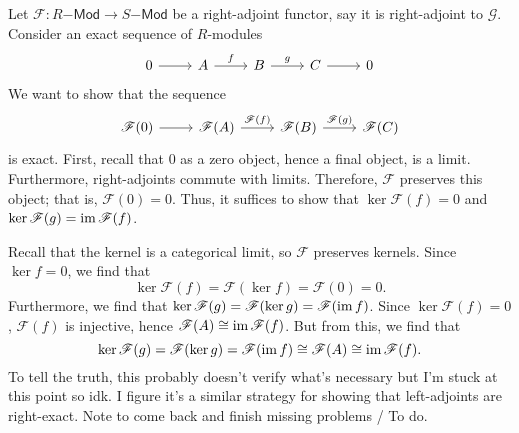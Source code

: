 \documentclass[../../master.tex]{subfiles}
\begin{document}
\begin{solution}
    Let $\mathscr{F} : R\mathsf{-Mod} \to S\mathsf{-Mod}$ be a right-adjoint functor, say it is right-adjoint to $\mathscr{G}$.
    Consider an exact sequence of $R$-modules
    \[
    \begin{tikzcd}
        0 & A & B & C & 0
        \arrow[from=1-1, to=1-2]
        \arrow["f", from=1-2, to=1-3]
        \arrow["g", from=1-3, to=1-4]
        \arrow[from=1-4, to=1-5] 
    \end{tikzcd}
    \]
    We want to show that the sequence
    \[
        \begin{tikzcd}
            \mathscr{F}(0) & \mathscr{F}(A) & \mathscr{F}(B) & \mathscr{F}(C)
            \arrow[from=1-1, to=1-2] 
            \arrow["\mathscr{F}(f)", from=1-2, to=1-3]
            \arrow["\mathscr{F}(g)", from=1-3, to=1-4]
        \end{tikzcd}
    \]
    is exact.
    First, recall that $0$ as a zero object, hence a final object, is a limit.
    Furthermore, right-adjoints commute with limits.
    Therefore, $\mathscr{F}$ preserves this object; that is, $\mathscr{F}(0) = 0$.
    Thus, it suffices to show that $\ker\mathscr{F}(f) = 0$ and $\ker \mathscr{F}(g) = \operatorname{im} \mathscr{F}(f)$.

    Recall that the kernel is a categorical limit, so $\mathscr{F}$ preserves kernels.
    Since $\ker f = 0$, we find that
    \[
        \ker \mathscr{F}(f) = \mathscr{F}(\ker f) = \mathscr{F}(0) = 0.
    \]
    Furthermore, we find that $\ker \mathscr{F}(g) = \mathscr{F}(\ker g) = \mathscr{F}(\operatorname{im} f)$.
    Since $\ker \mathscr{F}(f) = 0$, $\mathscr{F}(f)$ is injective, hence $\mathscr{F}(A) \cong \operatorname{im} \mathscr{F}(f)$.
    But from this, we find that
    \[
        \ker \mathscr{F}(g) = \mathscr{F}(\ker g) = \mathscr{F}(\operatorname{im} f) \cong \mathscr{F}(A) \cong \operatorname{im} \mathscr{F}(f).
    \]
    To tell the truth, this probably doesn't verify what's necessary but I'm stuck at this point so idk.
    I figure it's a similar strategy for showing that left-adjoints are right-exact.
    Note to come back and finish missing problems / To do.
\end{solution}
\end{document}
